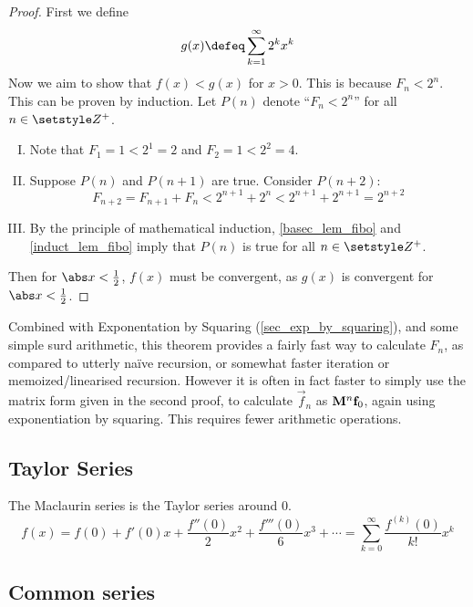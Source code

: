 \begin{proof}
 First we define
 \begin{equation*}
  g(x) \defeq \sum_{k=1}^\infty 2^k x^k
 \end{equation*}
 Now we aim to show that \(f(x) < g(x)\) for \(x > 0\). This is because
 \(F_n < 2^n\). This can be proven by induction. Let \(P(n)\) denote
 ``\(F_n < 2^n\)'' for all \(n \in \Integers^+\).
 \begin{enumerate}[I.]
  \item \label{basec_lem_fibo}
        Note that \(F_1 = 1 < 2^1 = 2\) and \(F_2 = 1 < 2^2 = 4\).
  \item \label{induct_lem_fibo}
        Suppose \(P(n)\) and \(P(n + 1)\) are true. Consider \(P(n + 2)\):
        \begin{equation*}
        F_{n + 2} = F_{n + 1} + F_n < 2^{n + 1} + 2^n < 2^{n + 1} + 2^{n + 1}
            = 2^{n + 2}
        \end{equation*}
  \item By the principle of mathematical induction, \ref{basec_lem_fibo} and
        \ref{induct_lem_fibo} imply that \(P(n)\) is true for all
        \(n \in \Integers^+\).
 \end{enumerate}
 Then for \(\abs x < \frac 12\), \(f(x)\)  must be convergent, as \(g(x)\) is
 convergent for \(\abs x < \frac 12\).
\end{proof}
Combined with Exponentation by Squaring (\ref{sec_exp_by_squaring}), and some
simple surd arithmetic, this theorem provides a fairly fast way to calculate
\(F_n\), as compared to utterly na\"ive recursion, or somewhat faster iteration
or memoized/linearised recursion. However it is often in fact faster to
simply use the matrix form given in the second proof, to calculate
\(\vec f_n\) as \(\mathbf{M}^n\mathrm{\mathbf{f}}_0\), again using exponentiation by squaring.
This requires fewer arithmetic operations.

\subsection{Taylor Series}

The Maclaurin series is the Taylor series around \(0\).
\begin{equation}
f(x) = f(0) + f'(0) x + \frac{f''(0)} 2 x^2 + \frac{f'''(0)}6 x^3 +\dotsb
  = \sum_{k=0}^\infty \frac{f^{(k)}(0)}{k!}x^k
\end{equation}

\subsection{Common series}
